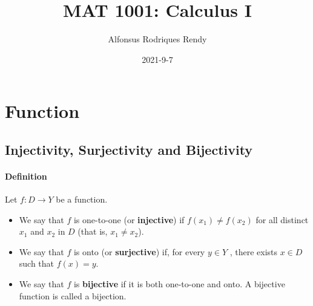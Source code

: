 \documentclass[12pt]{article}
\title{MAT 1001: Calculus I}
\author{Alfonsus Rodriques Rendy}
\date{2021-9-7}
\begin{document}
\begin{center}
    \hspace*{-0.5cm}
\end{center}


\section{Function}
\subsection{Injectivity, Surjectivity and Bijectivity}
\paragraph{Definition} Let $f : D \rightarrow Y$ be a function.

\begin{itemize} 
    \item We say that $f$ is one-to-one (or \textbf{injective}) if $f(x_1) \neq f(x_2)$ for
    all distinct $x_1$ and $x_2$ in $D$ (that is, $x_1 \neq x_2$).
    \item We say that $f$ is onto (or \textbf{surjective}) if, for every $y \in Y$ , there
    exists $x \in D$ such that $f(x) = y$.
    \item We say that $f$ is \textbf{bijective} if it is both one-to-one and onto. A
    bijective function is called a bijection.
\end{itemize}
\end{document}
